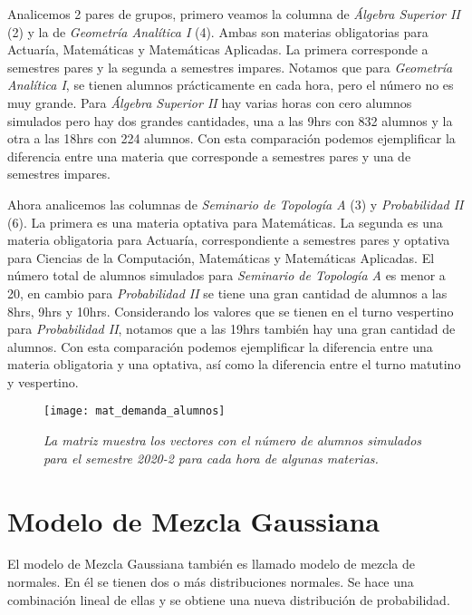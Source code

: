 Analicemos 2 pares de grupos, primero veamos la columna de \textit{Álgebra Superior II} (2) y la de \textit{Geometría Analítica I} (4). Ambas son materias obligatorias para Actuaría, Matemáticas y Matemáticas Aplicadas. La primera corresponde a semestres pares y la segunda a semestres impares. Notamos que para \textit{Geometría Analítica I}, se tienen alumnos prácticamente en cada hora, pero el número no es muy grande. Para \textit{Álgebra Superior II} hay varias horas con cero alumnos simulados pero hay dos grandes cantidades, una a las 9hrs con 832 alumnos y la otra a las 18hrs con 224 alumnos. Con esta comparación podemos ejemplificar la diferencia entre una materia que corresponde a semestres pares y una de semestres impares.

Ahora analicemos las columnas de \textit{Seminario de Topología A} (3) y \textit{Probabilidad II} (6). La primera es una materia optativa para Matemáticas. La segunda es una materia obligatoria para Actuaría, correspondiente a semestres pares y optativa para Ciencias de la Computación, Matemáticas y Matemáticas Aplicadas. El número total de alumnos simulados para \textit{Seminario de Topología A} es menor a 20, en cambio para \textit{Probabilidad II} se tiene una gran cantidad de alumnos a las 8hrs, 9hrs y 10hrs. Considerando los valores que se tienen en el turno vespertino para \textit{Probabilidad II}, notamos que a las 19hrs también hay una gran cantidad de alumnos. Con esta comparación podemos ejemplificar la diferencia entre una materia obligatoria y una optativa, así como la diferencia entre el turno matutino y vespertino.


\begin{figure}[H]
\centering
\texttt{[image: mat\_demanda\_alumnos]} %
\caption[\textit{Ejemplo de matriz con demanda simulada para el 2020-2}]{\textit{La matriz muestra los vectores con el número de alumnos simulados para el semestre 2020-2 para cada hora de algunas materias.}}\label{matDemandaAlum}
\end{figure}


\section{Modelo de Mezcla Gaussiana} \label{sec_GMM}

El modelo de Mezcla Gaussiana también es llamado modelo de mezcla de normales. En él se tienen dos o más distribuciones normales. Se hace una combinación lineal de ellas y se obtiene una nueva distribución de probabilidad.

